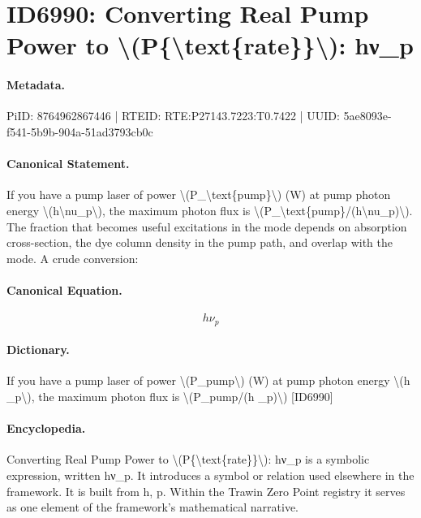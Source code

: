 \section*{ID6990: Converting Real Pump Power to \textbackslash{}(P\{\textbackslash{}text\{rate\}\}\textbackslash{}): hν\_p}
\paragraph{Metadata.}
PiID: 8764962867446 | RTEID: RTE:P27143.7223:T0.7422 | UUID: 5ae8093e-f541-5b9b-904a-51ad3793cb0c

\paragraph{Canonical Statement.}
If you have a pump laser of power \textbackslash{}(P\_\textbackslash{}text\{pump\}\textbackslash{}) (W) at pump photon energy \textbackslash{}(h\textbackslash{}nu\_p\textbackslash{}), the maximum photon flux is \textbackslash{}(P\_\textbackslash{}text\{pump\}/(h\textbackslash{}nu\_p)\textbackslash{}). The fraction that becomes useful excitations in the mode depends on absorption cross-section, the dye column density in the pump path, and overlap with the mode. A crude conversion:

\paragraph{Canonical Equation.}
\[
h\nu_p
\]

\paragraph{Dictionary.}
If you have a pump laser of power \textbackslash{}(P\_pump\textbackslash{}) (W) at pump photon energy \textbackslash{}(h \_p\textbackslash{}), the maximum photon flux is \textbackslash{}(P\_pump/(h \_p)\textbackslash{}) [ID6990]

\paragraph{Encyclopedia.}
Converting Real Pump Power to \textbackslash{}(P\{\textbackslash{}text\{rate\}\}\textbackslash{}): hν\_p is a symbolic expression, written hν\_p. It introduces a symbol or relation used elsewhere in the framework. It is built from h, p. Within the Trawin Zero Point registry it serves as one element of the framework's mathematical narrative.
